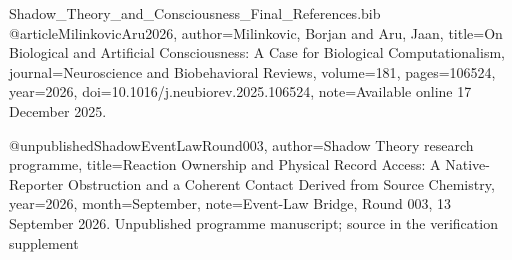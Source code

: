 \begin{filecontents*}[overwrite]{Shadow_Theory_and_Consciousness_Final_References.bib}
@article{MilinkovicAru2026,
 author={Milinkovic, Borjan and Aru, Jaan},
 title={On Biological and Artificial Consciousness: A Case for Biological Computationalism},
 journal={Neuroscience and Biobehavioral Reviews},
 volume={181},
 pages={106524},
 year={2026},
 doi={10.1016/j.neubiorev.2025.106524},
 note={Available online 17 December 2025. }
}


@unpublished{ShadowEventLawRound003,
 author={{Shadow Theory research programme}},
 title={Reaction Ownership and Physical Record Access: A Native-Reporter Obstruction and a Coherent Contact Derived from Source Chemistry},
 year={2026},
 month={September},
 note={Event-Law Bridge, Round 003, 13 September 2026. Unpublished programme manuscript; source in the verification supplement}
}

\end{filecontents*}
\documentclass[11pt,oneside,openany]{book}
\usepackage[T1]{fontenc}
\usepackage[utf8]{inputenc}
\usepackage{lmodern,microtype}
\usepackage[a4paper,inner=28mm,outer=27mm,top=27mm,bottom=28mm,headheight=15pt]{geometry}
\usepackage{amsmath,amssymb,amsthm,mathtools,bm,mathrsfs}
\usepackage{booktabs,longtable,tabularx,array,multirow}
\usepackage{enumitem}
\usepackage{graphicx,xcolor}
\usepackage{tikz,tikz-cd}
\usetikzlibrary{arrows.meta,positioning,calc}
\usepackage{fancyhdr}
\usepackage{xurl}
\usepackage{hyperref}
\usepackage[capitalize,noabbrev]{cleveref}
\usepackage{etoolbox}
\usepackage{needspace}
\setlength{\emergencystretch}{2.5em}
\setlength{\parskip}{0.18em}
\setlength{\parindent}{1.2em}
\makeatletter
\renewcommand*\l@section{\@dottedtocline{1}{1.5em}{3.2em}}
\makeatother
\setcounter{tocdepth}{1}
\setcounter{secnumdepth}{2}
\pagestyle{fancy}
\fancyhf{}
\fancyhead[L]{\small\nouppercase{\leftmark}}
\fancyfoot[C]{\thepage}
\renewcommand{\headrulewidth}{0.3pt}
\renewcommand{\chaptermark}[1]{\markboth{\thechapter\quad #1}{}}
\fancypagestyle{plain}{\fancyhf{}\fancyfoot[C]{\thepage}\renewcommand{\headrulewidth}{0pt}}
\theoremstyle{plain}
\newtheorem{theorem}{Theorem}[chapter]
\newtheorem{proposition}[theorem]{Proposition}
\newtheorem{lemma}[theorem]{Lemma}
\newtheorem{corollary}[theorem]{Corollary}
\theoremstyle{definition}
